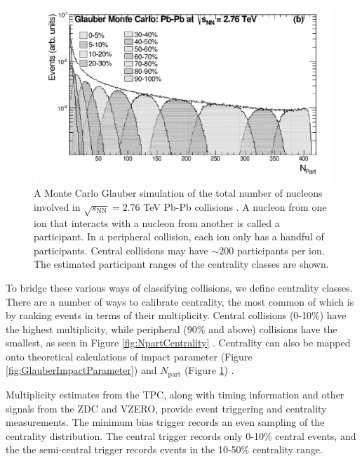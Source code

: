 \begin{figure}[hbt]
\includegraphics[width=36pc]{Figures/BorrowedFigures/GlauberCentrality.pdf}
\caption[Monte Carlo Glauber number of participants simulation]{A Monte Carlo Glauber simulation of the total number of nucleons involved in $\sqrt{s_\mathrm{NN}} = 2.76$ TeV Pb-Pb collisions \cite{Abelev:2013xaa}.
A nucleon from one ion that interacts with a nucleon from another is called a participant.
In a peripheral collision, each ion only has a handful of participants.
Central collisions may have $\sim 200$ participants per ion.
The estimated participant ranges of the centrality classes are shown.
}
\label{fig:GlauberCentrality}
\end{figure}

To bridge these various ways of classifying collisions, we define centrality classes.
There are a number of ways to calibrate centrality, the most common of which is by ranking events in terms of their multiplicity.
Central collisions (0-10\%) have the highest multiplicity, while peripheral (90\% and above) collisions have the smallest, as seen in Figure \ref{fig:NpartCentrality} \cite{Aamodt:2010pa}.
Centrality can also be mapped onto theoretical calculations of impact parameter (Figure \ref{fig:GlauberImpactParameter}) and $N_\mathrm{part}$ (Figure \ref{fig:GlauberCentrality}) \cite{Abelev:2013xaa}.

Multiplicity estimates from the TPC, along with timing information and other signals from the ZDC and VZERO, provide event triggering and centrality measurements.
The minimum bias trigger records an even sampling of the centrality distribution.
The central trigger records only 0-10\% central events, and the the semi-central trigger records events in the 10-50\% centrality range.

